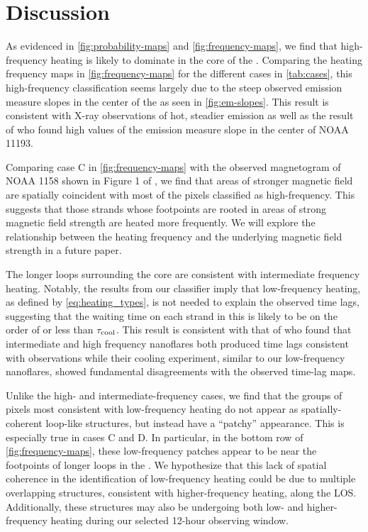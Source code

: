 \section{Discussion}\label{sec:discussion}

As evidenced in \autoref{fig:probability-maps} and \autoref{fig:frequency-maps}, we find that high-frequency heating is likely to dominate in the core of the \AR. 
Comparing the heating frequency maps in \autoref{fig:frequency-maps} for the different cases in \autoref{tab:cases}, this high-frequency classification seems largely due to the steep observed emission measure slopes in the center of the \AR{} as seen in \autoref{fig:em-slopes}.
This result is consistent with X-ray observations of hot, steadier emission \citep{warren_evidence_2010,warren_constraints_2011,winebarger_using_2011} as well as the result of \citet{del_zanna_evolution_2015} who found high values of the emission measure slope in the center of NOAA 11193.

Comparing case C in \autoref{fig:frequency-maps} with the observed magnetogram of NOAA 1158 shown in Figure 1 of , we find that areas of stronger magnetic field are spatially coincident with most of the pixels classified as high-frequency.
This suggests that those strands whose footpoints are rooted in areas of strong magnetic field strength are heated more frequently.
We will explore the relationship between the heating frequency and the underlying magnetic field strength in a future paper.

The longer loops surrounding the core are consistent with intermediate frequency heating.
Notably, the results from our classifier imply that low-frequency heating, as defined by \autoref{eq:heating_types}, is not needed to explain the observed time lags, suggesting that the waiting time on each strand in this \AR{} is likely to be on the order of or less than $\tau_\textup{cool}$.
This result is consistent with that of \citet{bradshaw_patterns_2016} who found that intermediate and high frequency nanoflares both produced time lags consistent with observations while their cooling experiment, similar to our low-frequency nanoflares, showed fundamental disagreements with the observed time-lag maps.

Unlike the high- and intermediate-frequency cases, we find that the groups of pixels most consistent with low-frequency heating do not appear as spatially-coherent loop-like structures, but instead have a ``patchy'' appearance.
This is especially true in cases C and D.
In particular, in the bottom row of \autoref{fig:frequency-maps}, these low-frequency patches appear to be near the footpoints of longer loops in the \AR{}.
We hypothesize that this lack of spatial coherence in the identification of low-frequency heating could be due to multiple overlapping structures, consistent with higher-frequency heating, along the LOS.
Additionally, these structures may also be undergoing both low- and higher-frequency heating during our selected 12-hour observing window.

